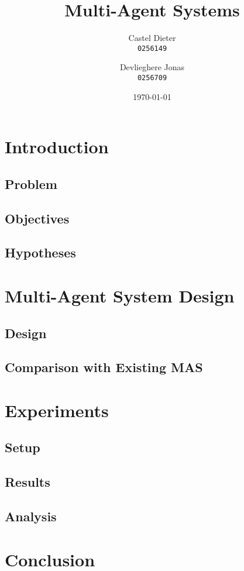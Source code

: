 \documentclass[11pt,a4paper,oneside]{article}
\title{Multi-Agent Systems}
\author{
  Castel Dieter\\
  \texttt{0256149}
  \and
  Devlieghere Jonas\\
  \texttt{0256709}
}
\date{\today}
\begin{document}
\maketitle
\tableofcontents
\listoffigures
\listoftables
\newpage

\section{Introduction}


\subsection{Problem}


\subsection{Objectives}


\subsection{Hypotheses}


\section{Multi-Agent System Design}

\subsection{Design}


\subsection{Comparison with Existing MAS}


\section{Experiments}

\subsection{Setup}


\subsection{Results}


\subsection{Analysis}


\section{Conclusion}


\newpage


\nocite{*}
\end{document}
